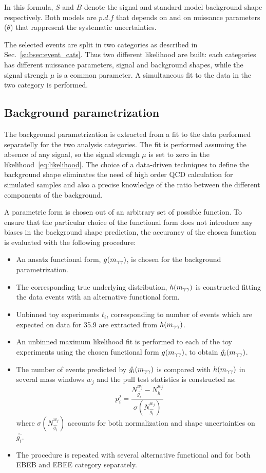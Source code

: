 In this formula, $S$ and $B$ denote the signal and standard model background shape respectively. Both
models are $p.d.f$ that depends on \mgg and on nuissance parameters ($\theta$) that rappresent the systematic uncertainties.

The selected events are split in two categories as described in Sec.~\ref{subsec:event_cats}.
Thus two different likelihood are built: each categories has different nuissance parameters, signal and background shapes,
while the signal strengh $\mu $ is a common parameter.
A simultaneous fit to the data in the two category is performed.

\subsection{Background parametrization}
\label{subsec:background}
The background parametrization is extracted from a fit to the data performed separatelly for the two analysis
categories. The fit is performed assuming the absence of any signal, so the signal strengh $\mu$ is set
to zero in the likelihood~\ref{eq:likelihood}.
The choice of a data-driven techniques to define the background shape eliminates the need of high order
QCD calculation for simulated samples and also a precise knowledge of the ratio between the different
components of the background.

A parametric form is chosen out of an arbitrary set of possible function.
To ensure that the particular choice of the functional form does not introduce any biases in the
background shape prediction, the accurancy of the chosen function is evaluated with the following
procedure:

\begin{itemize}
      \item An ansatz functional form, $g(m_{\gamma\gamma})$, is chosen for the background
        parametrization.
      \item The corresponding true underlying distribution, $h(m_{\gamma\gamma})$ is constructed fitting the
        data events with an alternative functional form.
      \item Unbinned toy experiments $t_{i}$, corresponding to number of events which are expected on data for 35.9 \fbinv
        are extracted from $h(m_{\gamma\gamma})$.
      \item An unbinned maximum likelihood fit is performed to each of the toy experiments using the chosen
        functional form $g(m_{\gamma\gamma})$, to obtain $\hat{g_{i}}(m_{\gamma\gamma})$.
      \item The number of events predicted by $\hat{g_{i}}(m_{\gamma\gamma})$ is compared with $h(m_{\gamma\gamma})$
        in several mass windows $w_{j}$ and the pull test statistics is constructed as:
        $$ p^{j}_{i} = \frac{ N^{w_j}_{\hat{g_i}} - N^{w_j}_{h} } { \sigma(N^{w_j}_{\hat{g_i}}) } $$
        where $\sigma(N^{w_j}_{\hat{g_i}})$ accounts for both normalization and shape
        uncertainties on $\hat{g_i}$.
      \item The procedure is repeated with several alternative functional and for both EBEB and EBEE category separately.
\end{itemize}

